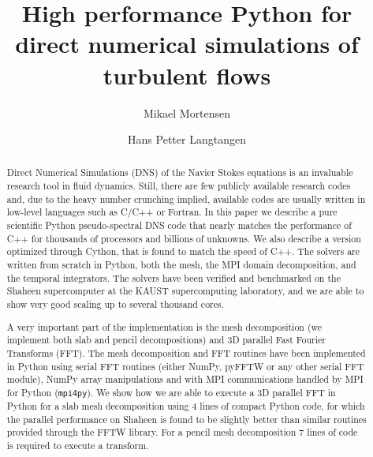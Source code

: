 \documentclass[final,3p,times,twocolumn]{elsarticle}
\newcommand{\inpyth}{\lstinline[style=inlinestyle]}
\begin{document}
\begin{frontmatter}





\title{High performance Python for direct numerical simulations of turbulent flows}



\author[a,b]{Mikael Mortensen}
\author[b,c]{Hans Petter Langtangen}
\address[a]{Department of Mathematics, University of Oslo, Norway}
\address[b]{Center for Biomedical Computing at Simula Research Laboratory, N-1325 Lysaker, Norway}
\address[c]{Department of Informatics, University of Oslo, Norway}


\newcommand{\hpl}[1]{({\bf hpl comment:} \emph{#1})}







\begin{abstract}
Direct Numerical Simulations (DNS) of the Navier Stokes equations is an
invaluable research tool in fluid dynamics. Still, there are few publicly
available research codes and, due to the heavy number crunching implied,
available codes are usually written in low-level
languages such as C/C++ or Fortran.
In this paper we describe a pure scientific Python pseudo-spectral DNS code
that nearly matches the performance of C++ for thousands of processors
and billions of unknowns. We also describe a version optimized through Cython, 
that is found to match the speed of C++. The solvers are written from scratch 
in Python, both the mesh, the MPI domain decomposition, and the temporal 
integrators. The solvers have been verified and benchmarked on the Shaheen 
supercomputer at the KAUST supercomputing laboratory, and we are able to show 
very good scaling up to several thousand cores.

A very important part of the implementation is the mesh decomposition (we 
implement both slab and pencil decompositions) and 3D parallel Fast Fourier 
Transforms (FFT). The mesh decomposition and FFT routines have been implemented 
in Python using serial FFT routines (either NumPy, pyFFTW or any other serial 
FFT module), NumPy array manipulations and with MPI communications handled by  
MPI for Python (\inpyth{mpi4py}). We show how we are able to execute a 3D 
parallel FFT in Python for a slab mesh decomposition using 4 lines of compact 
Python code, for which the parallel performance on Shaheen is found to be 
slightly better than similar routines provided through the FFTW library. For a 
pencil mesh decomposition 7 lines of code is required to execute a transform.



\end{abstract}
\end{frontmatter}
\end{document}
